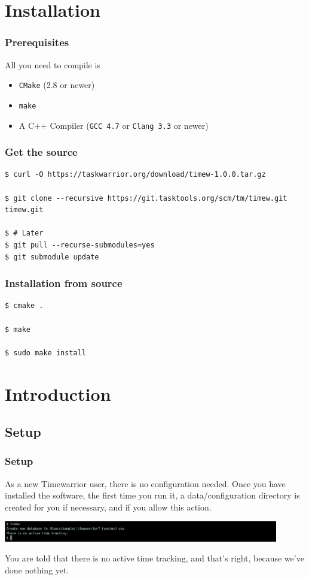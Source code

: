 \documentclass[t,handout]{beamer}
\begin{document}
\section{Installation}

\begin{frame}[fragile]\frametitle{Prerequisites}
    \vfill
    All you need to compile is
    \begin{itemize}
        \item \verb+CMake+ (2.8 or newer)
        \item \verb+make+
        \item A C++ Compiler (\verb+GCC 4.7+ or \verb+Clang 3.3+ or newer)
    \end{itemize}
\end{frame}

\begin{frame}[fragile]\frametitle{Get the source}
    \vfill
    \begin{lstlisting}
$ curl -O https://taskwarrior.org/download/timew-1.0.0.tar.gz

$ git clone --recursive https://git.tasktools.org/scm/tm/timew.git timew.git

$ # Later
$ git pull --recurse-submodules=yes
$ git submodule update\end{lstlisting}
\end{frame}

\begin{frame}[fragile]\frametitle{Installation from source}
    \vfill
    \begin{lstlisting}
$ cmake .

$ make

$ sudo make install\end{lstlisting}
\end{frame}

\section{Introduction}

\subsection{Setup}

\begin{frame}[fragile]\frametitle{Setup}
    \vfill
    As a new Timewarrior user, there is no configuration needed. Once you have installed the software, the first time you run it, a data/configuration directory is created for you if necessary, and if you allow this action.

    \includegraphics[width=12cm]{images/tutorial1.png}

    You are told that there is no active time tracking, and that's right, because we've done nothing yet.
\end{frame}
\end{document}
